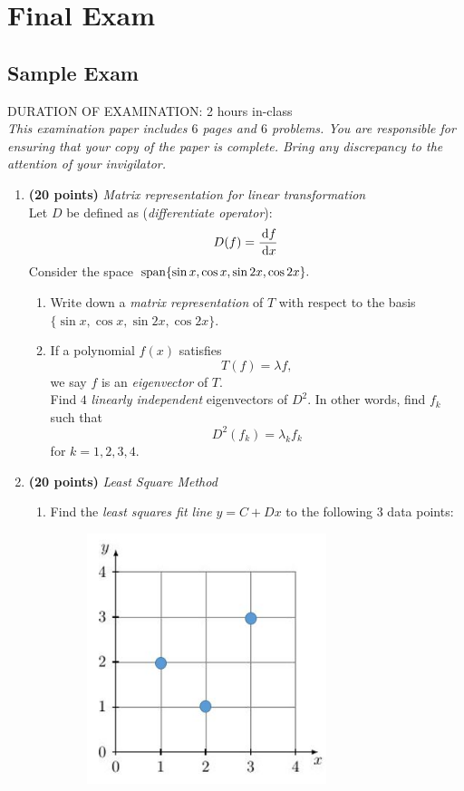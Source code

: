 
\chapter{Final Exam}

\section{Sample Exam}
DURATION OF EXAMINATION: 2 hours in-class\\
\textit{This examination paper includes $6$ pages and $6$ problems. You are responsible for ensuring that
your copy of the paper is complete. Bring any discrepancy to the attention of your invigilator.}\\
\begin{enumerate}
\item \textbf{(20 points)} \textit{Matrix representation for linear transformation}\\
Let $D$ be defined as (\textit{differentiate operator}):
\[
D(f)=\frac{\,\mathrm{d} f}{\,\mathrm{d} x}
\]
Consider the space $\operatorname{span}\{\sin x,\cos x,\sin 2x,\cos 2x\}.$
\begin{enumerate}
\item
Write down a \textit{matrix representation} of $T$ with respect to the basis $\{\sin x,\cos x,\sin 2x,\cos 2x\}.$\\
\item
If a polynomial $f(x)$ satisfies
\[
T(f)=\lambda f,
\]
we say $f$ is an \textit{eigenvector} of $T$.\\
Find $4$ \textit{linearly independent} eigenvectors of $D^2$. In other words, find $f_k$ such that
\[
D^2(f_k)=\lambda_kf_k
\]
for $k=1,2,3,4$.
\end{enumerate}
\newpage
\item \textbf{(20 points)} \textit{Least Square Method}\\
\begin{enumerate}
\item
Find the \textit{least squares fit line} $y=C+Dx$ to the following 3 data points:
\begin{figure}[H]
\centering
\includegraphics[width=7cm]{exam/final/least_square}

\end{figure}
\end{enumerate}
\end{enumerate}
